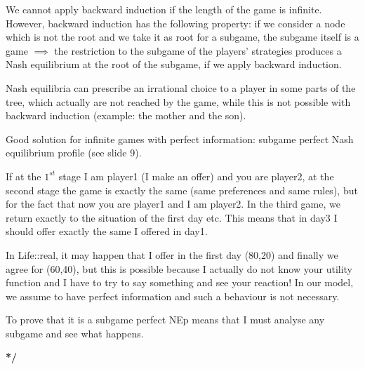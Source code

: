 \noindent We cannot apply backward induction if the length of the game is 
infinite. However, backward induction has the following property: if we 
consider a node which is not the root and we take it as root for a subgame, 
the subgame itself is a game $\implies$ the restriction to the subgame of the 
players' strategies produces a Nash equilibrium at the root of the subgame, if 
we apply backward induction.

\noindent Nash equilibria can prescribe an irrational choice to a player in 
some parts of the tree, which actually are not reached by the game, while 
this is not possible with backward induction (example: the mother and the son).

\noindent Good solution for infinite games with perfect information: subgame 
perfect Nash equilibrium profile (see slide 9).

\noindent If at the $1^{st}$ stage I am player1 (I make an offer) and you are 
player2, at the second stage the game is exactly the same (same preferences 
and same rules), but for the fact that now you are player1 and I am player2. In 
the third game, we return exactly to the situation of the first day etc. This 
means that in day3 I should offer exactly the same I offered in day1.

\noindent In Life::real, it may happen that I offer in the first day (80,20) and 
finally we agree for (60,40), but this is possible because I actually do not 
know your utility function and I have to try to say something and see your 
reaction! In our model, we assume to have perfect information and such a 
behaviour is not necessary.

\bigskip
\noindent To prove that it is a subgame perfect NEp means that I must 
analyse any subgame and see what happens.

\noindent \textbf{*/}

%
